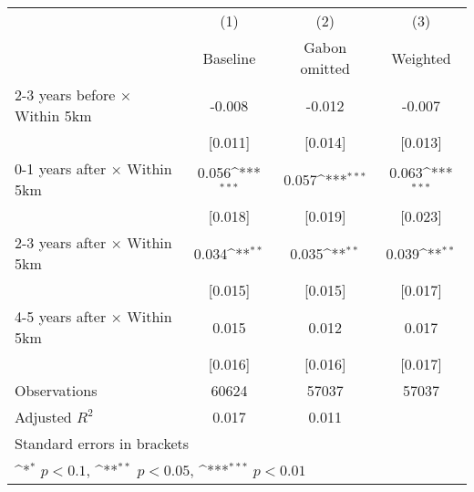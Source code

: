 {
\def\sym#1{\ifmmode^{#1}\else\(^{#1}\)\fi}
\begin{tabular}{l*{3}{c}}
\hline\hline
                    &\multicolumn{1}{c}{(1)}&\multicolumn{1}{c}{(2)}&\multicolumn{1}{c}{(3)}\\
                    &\multicolumn{1}{c}{Baseline}&\multicolumn{1}{c}{Gabon omitted}&\multicolumn{1}{c}{Weighted}\\
\hline
2-3 years before $\times$ Within 5km&      -0.008         &      -0.012         &      -0.007         \\
                    &     [0.011]         &     [0.014]         &     [0.013]         \\
0-1 years after $\times$ Within 5km&       0.056\sym{***}&       0.057\sym{***}&       0.063\sym{***}\\
                    &     [0.018]         &     [0.019]         &     [0.023]         \\
2-3 years after $\times$ Within 5km&       0.034\sym{**} &       0.035\sym{**} &       0.039\sym{**} \\
                    &     [0.015]         &     [0.015]         &     [0.017]         \\
4-5 years after $\times$ Within 5km&       0.015         &       0.012         &       0.017         \\
                    &     [0.016]         &     [0.016]         &     [0.017]         \\
\hline
Observations        &       60624         &       57037         &       57037         \\
Adjusted \(R^{2}\)  &       0.017         &       0.011         &                     \\
\hline\hline
\multicolumn{4}{l}{\footnotesize Standard errors in brackets}\\
\multicolumn{4}{l}{\footnotesize \sym{*} \(p<0.1\), \sym{**} \(p<0.05\), \sym{***} \(p<0.01\)}\\
\end{tabular}
}
